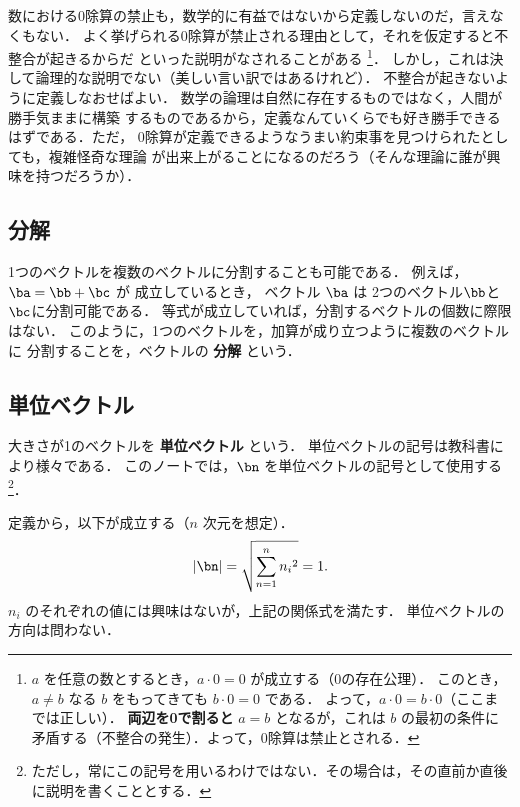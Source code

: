             数における0除算の禁止も，数学的に有益ではないから定義しないのだ，言えなくもない．
            よく挙げられる0除算が禁止される理由として，それを仮定すると不整合が起きるからだ
            といった説明がなされることがある
                \footnote{
                     $a$ を任意の数とするとき，$a \cdot 0 = 0$ が成立する（0の存在公理）．
                     このとき，$a \neq b$ なる $b$ をもってきても $b \cdot 0 = 0$ である．
                     よって，$a \cdot 0 = b \cdot 0$（ここまでは正しい）．
                     \textbf{両辺を0で割ると} $a=b$ となるが，これは $b$ の最初の条件に
                     矛盾する（不整合の発生）．よって，0除算は禁止とされる．
                }．
            しかし，これは決して論理的な説明でない（美しい言い訳ではあるけれど）．
            不整合が起きないように定義しなおせばよい．
            数学の論理は自然に存在するものではなく，人間が勝手気ままに構築
            するものであるから，定義なんていくらでも好き勝手できるはずである．ただ，
            0除算が定義できるようなうまい約束事を見つけられたとしても，複雑怪奇な理論
            が出来上がることになるのだろう（そんな理論に誰が興味を持つだろうか）．

        \subsection{分解}
        1つのベクトルを複数のベクトルに分割することも可能である．
        例えば，$\ba = \bb + \bc$ が 成立しているとき，
        ベクトル $\ba$ は 2つのベクトル$\bb$と$\bc$に分割可能である．
        等式が成立していれば，分割するベクトルの個数に際限はない．
        このように，1つのベクトルを，加算が成り立つように複数のベクトルに
        分割することを，ベクトルの \textbf{分解} という．

        \subsection{単位ベクトル}
        大きさが1のベクトルを \textbf{単位ベクトル} という．
        単位ベクトルの記号は教科書により様々である．
        このノートでは，$\bn$ を単位ベクトルの記号として使用する
        \footnote{
            ただし，常にこの記号を用いるわけではない．その場合は，その直前か直後
            に説明を書くこととする．
        }．

        定義から，以下が成立する（$n$ 次元を想定）．
        \begin{align}
            |\bn| = \sqrt{\sum_{n=1}^{n} {n_{i}}^{2}} = 1.
        \end{align}
        $n_{i}$ のそれぞれの値には興味はないが，上記の関係式を満たす．
        単位ベクトルの方向は問わない．

